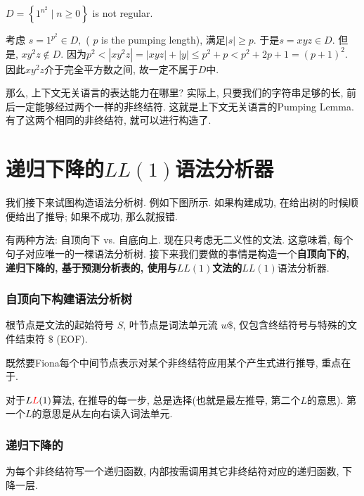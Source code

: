\documentclass{ctexart}
\begin{document}
\begin{example}
    $D=\left\{1^{n^2} \mid n \geq 0\right\}$ is not regular.

    考虑 $s=1^{p^2}\in D, $ ( $p$ is the pumping length), 满足$|s| \geq p$. 于是$s=x y z\in D$. 但是, $x y^2 z \notin D$. 因为$p^2<\left|x y^2 z\right|=|x y z|+|y| \leq p^2+p<p^2+2 p+1=(p+1)^2$. 因此$x y^2 z$介于完全平方数之间, 故一定不属于$D$中. 
\end{example}

那么, 上下文无关语言的表达能力在哪里? 实际上, 只要我们的字符串足够的长, 前后一定能够经过两个一样的非终结符. 这就是上下文无关语言的Pumping Lemma. 有了这两个相同的非终结符, 就可以进行构造了. 


\section{递归下降的$LL(1)$语法分析器} 我们接下来试图构造语法分析树. 例如下图所示. 如果构建成功, 在给出树的时候顺便给出了推导; 如果不成功, 那么就报错. 


有两种方法: 自顶向下 vs. 自底向上. 现在只考虑无二义性的文法. 这意味着, 每个句子对应唯一的一棵语法分析树. 接下来我们要做的事情是构造一个\textbf{自顶向下的, 递归下降的, 基于预测分析表的, 使用与$LL(1)$文法的}$LL(1)$语法分析器. 

\subsubsection{自顶向下构建语法分析树} 根节点是文法的起始符号 $S$, 叶节点是词法单元流 $w \$$, 仅包含终结符号与特殊的文件结束符 $\$$ (EOF).
        

既然要Fiona每个中间节点表示对某个非终结符应用某个产生式进行推导, 重点在于. 

对于$L{{\color{red}L}}(1)$算法, 在推导的每一步, 总是选择(也就是最左推导, 第二个$L$的意思). 第一个$L$的意思是从左向右读入词法单元. 

\subsubsection{递归下降的} 为每个非终结符写一个递归函数, 内部按需调用其它非终结符对应的递归函数, 下降一层. 
\end{document}
